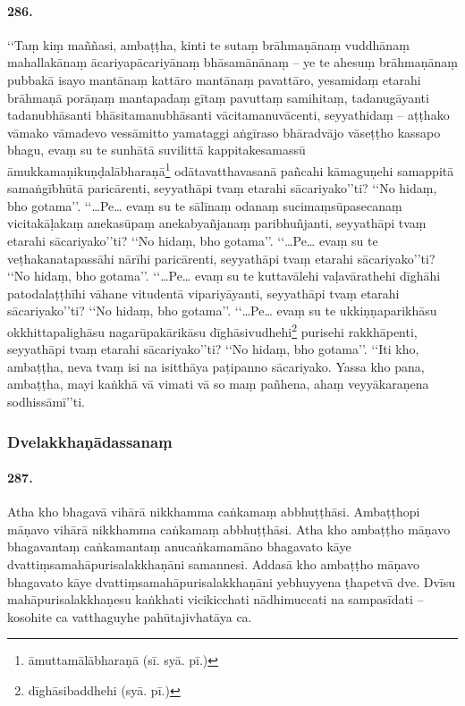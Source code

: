 \paragraph{286.} ‘‘Taṃ kiṃ maññasi, ambaṭṭha, kinti te sutaṃ brāhmaṇānaṃ vuddhānaṃ mahallakānaṃ ācariyapācariyānaṃ bhāsamānānaṃ – ye te ahesuṃ brāhmaṇānaṃ pubbakā isayo mantānaṃ kattāro mantānaṃ pavattāro, yesamidaṃ etarahi brāhmaṇā porāṇaṃ mantapadaṃ gītaṃ pavuttaṃ samihitaṃ, tadanugāyanti tadanubhāsanti bhāsitamanubhāsanti vācitamanuvācenti, seyyathidaṃ – aṭṭhako vāmako vāmadevo vessāmitto yamataggi aṅgīraso bhāradvājo vāseṭṭho kassapo bhagu, evaṃ su te sunhātā suvilittā kappitakesamassū āmukkamaṇikuṇḍalābharaṇā\footnote{āmuttamālābharaṇā (sī. syā. pī.)} odātavatthavasanā pañcahi kāmaguṇehi samappitā samaṅgībhūtā paricārenti, seyyathāpi tvaṃ etarahi sācariyako’’ti? ‘‘No hidaṃ, bho gotama’’. ‘‘…Pe… evaṃ su te sālīnaṃ odanaṃ sucimaṃsūpasecanaṃ vicitakāḷakaṃ anekasūpaṃ anekabyañjanaṃ paribhuñjanti, seyyathāpi tvaṃ etarahi sācariyako’’ti? ‘‘No hidaṃ, bho gotama’’. ‘‘…Pe… evaṃ su te veṭhakanatapassāhi nārīhi paricārenti, seyyathāpi tvaṃ etarahi sācariyako’’ti? ‘‘No hidaṃ, bho gotama’’. ‘‘…Pe… evaṃ su te kuttavālehi vaḷavārathehi dīghāhi patodalaṭṭhīhi vāhane vitudentā vipariyāyanti, seyyathāpi tvaṃ etarahi sācariyako’’ti? ‘‘No hidaṃ, bho gotama’’. ‘‘…Pe… evaṃ su te ukkiṇṇaparikhāsu okkhittapalighāsu nagarūpakārikāsu dīghāsivudhehi\footnote{dīghāsibaddhehi (syā. pī.)} purisehi rakkhāpenti, seyyathāpi tvaṃ etarahi sācariyako’’ti? ‘‘No hidaṃ, bho gotama’’. ‘‘Iti kho, ambaṭṭha, neva tvaṃ isi na isitthāya paṭipanno sācariyako. Yassa kho pana, ambaṭṭha, mayi kaṅkhā vā vimati vā so maṃ pañhena, ahaṃ veyyākaraṇena sodhissāmī’’ti.

\subsubsection{Dvelakkhaṇādassanaṃ}

\paragraph{287.} Atha kho bhagavā vihārā nikkhamma caṅkamaṃ abbhuṭṭhāsi. Ambaṭṭhopi māṇavo vihārā nikkhamma caṅkamaṃ abbhuṭṭhāsi. Atha kho ambaṭṭho māṇavo bhagavantaṃ caṅkamantaṃ anucaṅkamamāno bhagavato kāye dvattiṃsamahāpurisalakkhaṇāni samannesi. Addasā kho ambaṭṭho māṇavo bhagavato kāye dvattiṃsamahāpurisalakkhaṇāni yebhuyyena ṭhapetvā dve. Dvīsu mahāpurisalakkhaṇesu kaṅkhati vicikicchati nādhimuccati na sampasīdati – kosohite ca vatthaguyhe pahūtajivhatāya ca.

